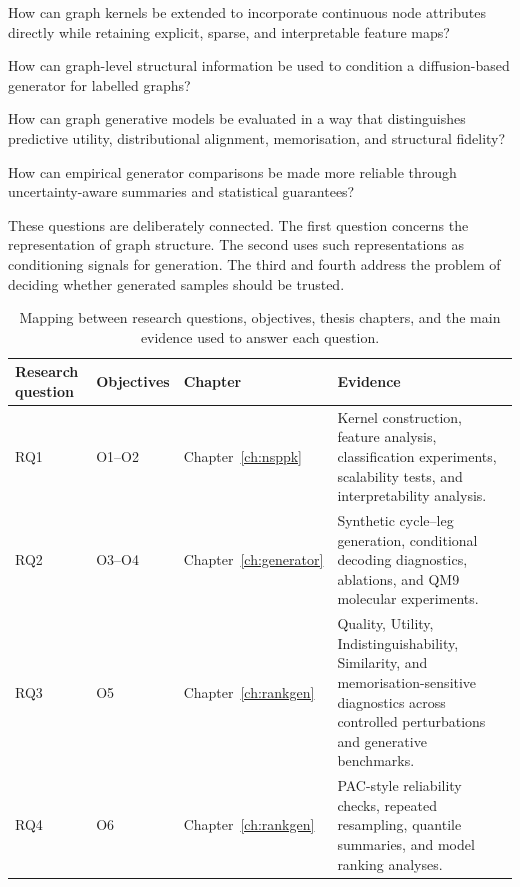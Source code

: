 \begin{description}[leftmargin=0pt,style=nextline]
    \item[RQ1.]
    How can graph kernels be extended to incorporate continuous node attributes
    directly while retaining explicit, sparse, and interpretable feature maps?

    \item[RQ2.]
    How can graph-level structural information be used to condition a
    diffusion-based generator for labelled graphs?

    \item[RQ3.]
    How can graph generative models be evaluated in a way that distinguishes
    predictive utility, distributional alignment, memorisation, and structural
    fidelity?

    \item[RQ4.]
    How can empirical generator comparisons be made more reliable through
    uncertainty-aware summaries and statistical guarantees?
\end{description}

These questions are deliberately connected. The first question concerns the
representation of graph structure. The second uses such representations as
conditioning signals for generation. The third and fourth address the problem
of deciding whether generated samples should be trusted.

\begin{table}[t]
\centering
\footnotesize
\begin{tabularx}{\textwidth}{@{}l l l X@{}}
\toprule
Research question & Objectives & Chapter & Evidence \\
\midrule
RQ1 & O1--O2 & Chapter~\ref{ch:nsppk} &
Kernel construction, feature analysis, classification experiments, scalability
tests, and interpretability analysis. \\
RQ2 & O3--O4 & Chapter~\ref{ch:generator} &
Synthetic cycle--leg generation, conditional decoding diagnostics, ablations,
and QM9 molecular experiments. \\
RQ3 & O5 & Chapter~\ref{ch:rankgen} &
Quality, Utility, Indistinguishability, Similarity, and memorisation-sensitive
diagnostics across controlled perturbations and generative benchmarks. \\
RQ4 & O6 & Chapter~\ref{ch:rankgen} &
PAC-style reliability checks, repeated resampling, quantile summaries, and
model ranking analyses. \\
\bottomrule
\end{tabularx}
\caption{Mapping between research questions, objectives, thesis chapters, and
the main evidence used to answer each question.}
\label{tab:intro:rq-objective-map}
\end{table}


